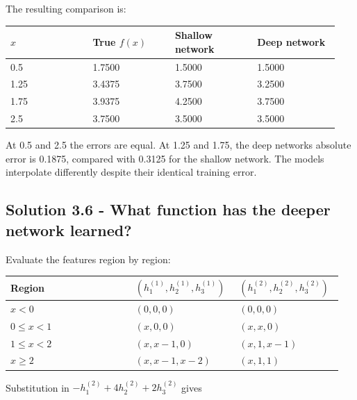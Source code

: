 \documentclass{course_sheet}
\begin{document}
The resulting comparison is:

\begin{center}

\begingroup
\setlength{\tabcolsep}{3pt}
\begin{tabular}{@{}p{0.234\linewidth}p{0.234\linewidth}p{0.234\linewidth}p{0.234\linewidth}@{}}
\toprule
$x$ & True $f(x)$ & Shallow network & Deep network \\
\midrule
0.5 & 1.7500 & 1.5000 & 1.5000 \\
1.25 & 3.4375 & 3.7500 & 3.2500 \\
1.75 & 3.9375 & 4.2500 & 3.7500 \\
2.5 & 3.7500 & 3.5000 & 3.5000 \\
\bottomrule
\end{tabular}
\endgroup

\end{center}

At 0.5 and 2.5 the errors are equal. At 1.25 and 1.75, the deep
network\textquotesingle s absolute error is 0.1875, compared with 0.3125
for the shallow network. The models interpolate differently despite
their identical training error.

\subsection{Solution 3.6 - What function has the deeper network learned?}

Evaluate the features region by region:

\begin{center}

\begingroup
\setlength{\tabcolsep}{3pt}
\begin{tabular}{@{}p{0.362\linewidth}p{0.295\linewidth}p{0.295\linewidth}@{}}
\toprule
Region & $(h^{(1)}_1,h^{(1)}_2,h^{(1)}_3)$ & $(h^{(2)}_1,h^{(2)}_2,h^{(2)}_3)$ \\
\midrule
$x<0$ & $(0,0,0)$ & $(0,0,0)$ \\
$0\leq x<1$ & $(x,0,0)$ & $(x,x,0)$ \\
$1\leq x<2$ & $(x,x-1,0)$ & $(x,1,x-1)$ \\
$x\geq2$ & $(x,x-1,x-2)$ & $(x,1,1)$ \\
\bottomrule
\end{tabular}
\endgroup

\end{center}

Substitution in $-h^{(2)}_1+4h^{(2)}_2+2h^{(2)}_3$ gives
\end{document}
